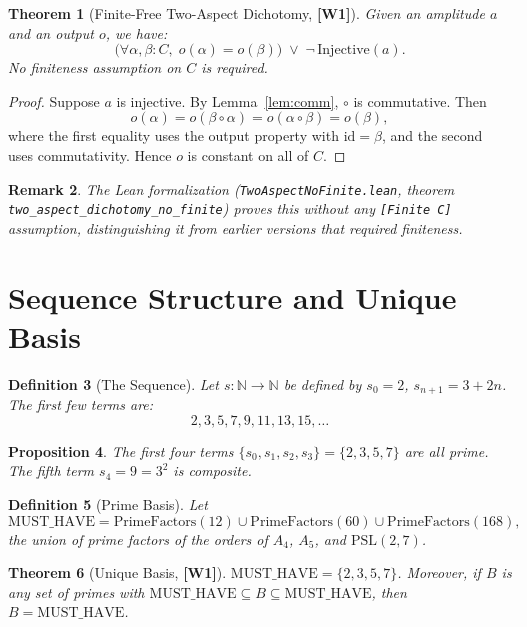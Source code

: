 ﻿\documentclass[11pt]{article}
\newcommand{\wone}[1]{\textcolor{wcolor}{\textbf{[#1]}}}
\newtheorem{theorem}{Theorem}
\newtheorem{definition}[theorem]{Definition}
\newtheorem{proposition}[theorem]{Proposition}
\newtheorem{remark}[theorem]{Remark}
\begin{document}
\begin{theorem}[Finite-Free Two-Aspect Dichotomy, \wone{W1}]
\label{thm:dichotomy}
Given an amplitude $a$ and an output $o$, we have:
\[
\bigl(\forall \alpha, \beta : C,\; o(\alpha) = o(\beta)\bigr)
\;\vee\;
\neg\,\mathrm{Injective}(a).
\]
No finiteness assumption on $C$ is required.
\end{theorem}

\begin{proof}
Suppose $a$ is injective. By Lemma~\ref{lem:comm}, $\circ$
is commutative. Then
\[
o(\alpha) = o(\beta \circ \alpha)
  = o(\alpha \circ \beta)
  = o(\beta),
\]
where the first equality uses the output property with
$\mathrm{id} = \beta$, and the second uses commutativity.
Hence $o$ is constant on all of $C$.
\end{proof}

\begin{remark}
The Lean formalization (\texttt{TwoAspectNoFinite.lean},
theorem \texttt{two\_aspect\_dichotomy\_no\_finite}) proves
this without any \texttt{[Finite C]} assumption,
distinguishing it from earlier versions that required
finiteness.
\end{remark}

\section{Sequence Structure and Unique Basis}
\label{sec:sequence}

\begin{definition}[The Sequence]
Let $s : \mathbb{N} \to \mathbb{N}$ be defined by
$s_0 = 2$, $s_{n+1} = 3 + 2n$. The first few terms are:
\[
2, 3, 5, 7, 9, 11, 13, 15, \ldots
\]
\end{definition}

\begin{proposition}
The first four terms $\{s_0, s_1, s_2, s_3\} = \{2, 3, 5, 7\}$
are all prime. The fifth term $s_4 = 9 = 3^2$ is composite.
\end{proposition}

\begin{definition}[Prime Basis]
Let
\[
\mathrm{MUST\_HAVE}
  = \mathrm{PrimeFactors}(12)
  \cup \mathrm{PrimeFactors}(60)
  \cup \mathrm{PrimeFactors}(168),
\]
the union of prime factors of the orders of $A_4$, $A_5$,
and $\mathrm{PSL}(2,7)$.
\end{definition}

\begin{theorem}[Unique Basis, \wone{W1}]
\label{thm:unique}
$\mathrm{MUST\_HAVE} = \{2, 3, 5, 7\}$.
Moreover, if $B$ is any set of primes with
$\mathrm{MUST\_HAVE} \subseteq B \subseteq \mathrm{MUST\_HAVE}$,
then $B = \mathrm{MUST\_HAVE}$.
\end{theorem}
\end{document}
